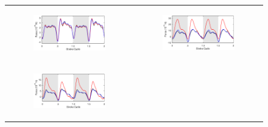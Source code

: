 \documentclass[fleqn,10pt]{wlscirep}
\begin{document}
\begin{figure}[ht]
\centering
\begin{tabular}{cc}
\begin{subfigure}{0.48\textwidth}
\centering
\includegraphics[width=\textwidth]{figures/eq_goodbad_1}
\caption{\label{fig:eq_goodbad_1}}
\end{subfigure} &
\begin{subfigure}{0.48\textwidth}
\centering
\includegraphics[width=\textwidth]{figures/eq_goodbad_2}
\caption{\label{fig:eq_goodbad_2}}
\end{subfigure} \\
\begin{subfigure}{0.48\textwidth}
\centering
\includegraphics[width=\textwidth]{figures/eq_goodbad_3}

\end{subfigure}
\end{tabular}
\end{figure}
\end{document}
